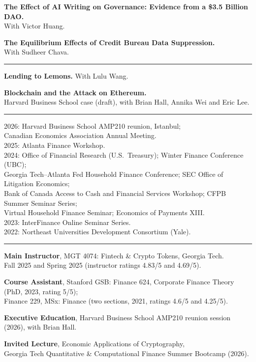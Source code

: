 \documentclass[11pt]{article}
\newcommand{\cvsection}[1]{\needspace{3.5\baselineskip}\vspace{0.5em}{\large\scshape #1}\par\vspace{-0.45em}\rule{\linewidth}{0.4pt}\par\vspace{0.25em}}
\begin{document}
\textbf{The Effect of AI Writing on Governance: Evidence from a \$3.5 Billion DAO.}\\
With Victor Huang.

\textbf{The Equilibrium Effects of Credit Bureau Data Suppression.}\\
With Sudheer Chava.

\cvsection{Work in Progress}

\textbf{Lending to Lemons.} With Lulu Wang.

\textbf{Blockchain and the Attack on Ethereum.}\\
Harvard Business School case (draft), with Brian Hall, Annika Wei and Eric Lee.

\newpage

\cvsection{Invited Talks and Presentations}

2026: Harvard Business School AMP210 reunion, Istanbul;\\
Canadian Economics Association Annual Meeting.\\
2025: Atlanta Finance Workshop.\\
2024: Office of Financial Research (U.S.\ Treasury); Winter Finance Conference (UBC);\\
Georgia Tech--Atlanta Fed Household Finance Conference; SEC Office of Litigation Economics;\\
Bank of Canada Access to Cash and Financial Services Workshop; CFPB Summer Seminar Series;\\
Virtual Household Finance Seminar; Economics of Payments XIII.\\
2023: InterFinance Online Seminar Series.\\
2022: Northeast Universities Development Consortium (Yale).

\cvsection{Teaching}

\textbf{Main Instructor}, MGT 4074: Fintech \& Crypto Tokens, Georgia Tech.\\
Fall 2025 and Spring 2025 (instructor ratings 4.83/5 and 4.69/5).

\textbf{Course Assistant}, Stanford GSB: Finance 624, Corporate Finance Theory (PhD, 2023, rating 5/5);\\
Finance 229, MSx: Finance (two sections, 2021, ratings 4.6/5 and 4.25/5).

\textbf{Executive Education}, Harvard Business School AMP210 reunion session (2026), with Brian Hall.

\textbf{Invited Lecture}, Economic Applications of Cryptography,\\
Georgia Tech Quantitative \& Computational Finance Summer Bootcamp (2026).
\end{document}
